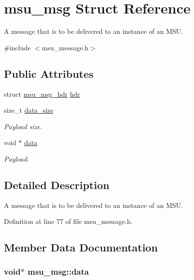 \hypertarget{structmsu__msg}{\section{msu\-\_\-msg Struct Reference}
\label{structmsu__msg}
}


A message that is to be delivered to an instance of an M\-S\-U.  




{\ttfamily \#include $<$msu\-\_\-message.\-h$>$}

\subsection*{Public Attributes}
\begin{DoxyCompactItemize}
\item 
struct \hyperlink{structmsu__msg__hdr}{msu\-\_\-msg\-\_\-hdr} \hyperlink{structmsu__msg_a3c0177321a542571240821c2350ba424}{hdr}
\item 
size\-\_\-t \hyperlink{structmsu__msg_ad6dbac0bebca6dacb6cc2b1157d114ba}{data\-\_\-size}
\begin{DoxyCompactList}\small\item\em Payload size. \end{DoxyCompactList}\item 
void $\ast$ \hyperlink{structmsu__msg_acf7674882a092f71624a1e70202fb8c2}{data}
\begin{DoxyCompactList}\small\item\em Payload. \end{DoxyCompactList}\end{DoxyCompactItemize}


\subsection{Detailed Description}
A message that is to be delivered to an instance of an M\-S\-U. 

Definition at line 77 of file msu\-\_\-message.\-h.



\subsection{Member Data Documentation}
\hypertarget{structmsu__msg_acf7674882a092f71624a1e70202fb8c2}{
\subsubsection[{data}]{\setlength{\rightskip}{0pt plus 5cm}void$\ast$ msu\-\_\-msg\-::data}}\label{structmsu__msg_acf7674882a092f71624a1e70202fb8c2}


